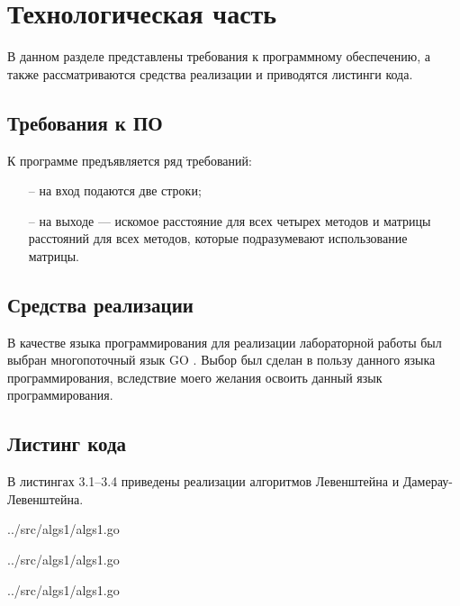 \chapter{Технологическая часть}

В данном разделе представлены требования к программному обеспечению, а также рассматриваются средства реализации и приводятся листинги кода.

\section{Требования к ПО}

К программе предъявляется ряд требований:
\begin{itemize}
	\item[--] на вход подаются две строки;
	\item[--] на выходе — искомое расстояние для всех четырех методов и матрицы расстояний для всех методов, которые подразумевают использование матрицы.
\end{itemize}

\section{Средства реализации}

В качестве языка программирования для реализации лабораторной работы был выбран многопоточный язык GO \cite{golang}. Выбор был сделан в пользу данного языка программирования, вследствие моего желания освоить данный язык программирования.

\section{Листинг кода}

В листингах 3.1--3.4 приведены реализации алгоритмов Левенштейна и Дамерау-Левенштейна.
\newpage

\begin{lstinputlisting}[
	caption={Матричный (Левенштейн)},
	label={lst:levenshteinmat},
	style={go},
	linerange={41-57},
	]{../src/algs1/algs1.go}
\end{lstinputlisting}

\begin{lstinputlisting}[
	caption={Рекурсивный (Дамерау-Левенштейн)},
	label={lst:dlevenshteinrec},
	style={go},
	linerange={123-148},
	]{../src/algs1/algs1.go}
\end{lstinputlisting}

\begin{lstinputlisting}[
	caption={Матричный (Дамерау-Левенштейн)},
	label={lst:dlevenshteinmatr},
	style={go},
	linerange={59-80},
	]{../src/algs1/algs1.go}
\end{lstinputlisting}

